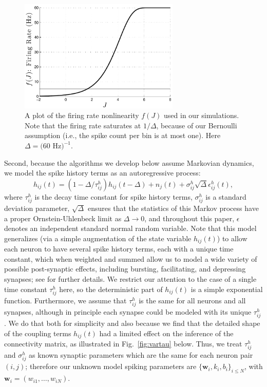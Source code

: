 \documentclass[aoas,preprint]{imsart}
\newcommand{\w}{w}
\newcommand{\bw}{\mathbf{\w}}
\begin{document}
\begin{figure}[t!]
\centering \includegraphics[width=3in]{../figs/fr_vs_J}
\caption{A plot of the firing rate nonlinearity $f(J)$ used in our
  simulations.  Note that the firing
  rate saturates at $1/\Delta$, because of our Bernoulli assumption
  (i.e., the spike count per bin is at most one). Here $\Delta = (60$
  Hz$)^{-1}$.}
\label{fig:egfluor}
\end{figure}

Second, because the algorithms we develop below assume Markovian dynamics, we model the spike history terms as an autoregressive process:
\begin{equation} \label{eqn:h:definition}
h_{ij}(t) = (1- \Delta/\tau^h_{ij}) h_{ij}(t- \Delta) +n_j(t) + \sigma^h_{ij}
  \sqrt{\Delta} \epsilon^h_{ij}(t),
\end{equation}
where $\tau^h_{ij}$ is the decay time constant for spike history terms, $\sigma^h_{ij}$ is a standard deviation parameter, $\sqrt{\Delta}$ ensures that the statistics of this Markov process have a proper Ornstein-Uhlenbeck limit as $\Delta \to 0$, and throughout this paper, $\epsilon$ denotes an independent standard normal random variable. Note that this model generalizes (via a simple augmentation of the state variable $h_{ij}(t)$) to allow each neuron to have several spike history terms, each with a unique time constant, which when weighted and summed allow us to model a wide variety of possible post-synaptic effects, including bursting, facilitating, and depressing synapses; see \cite{Vogelstein2009} for further details. We restrict our attention to the case of a single time constant $\tau^h_{ij}$ here, so the deterministic part of $h_{ij}(t)$ is a simple exponential function. Furthermore, we assume that $\tau^h_{ij}$ is the same for all neurons and all synapses, although in principle each synapse could be modeled with its unique $\tau^h_{ij}$. We do that both for simplicity and also because we find that the detailed shape of the coupling terms $h_{ij}(t)$ had a limited effect on the inference of the connectivity matrix, as illustrated in Fig.~\ref{fig:vartau} below. Thus, we treat $\tau^h_{ij}$ and $\sigma^h_{ij}$ as known synaptic parameters which are the same for each neuron pair $(i,j)$; therefore our unknown model spiking parameters are $\{\bw_i,k_i,b_i\}_{i\leq N}$, with $\bw_i=(\w_{i1},\ldots, \w_{iN})$.
\end{document}
